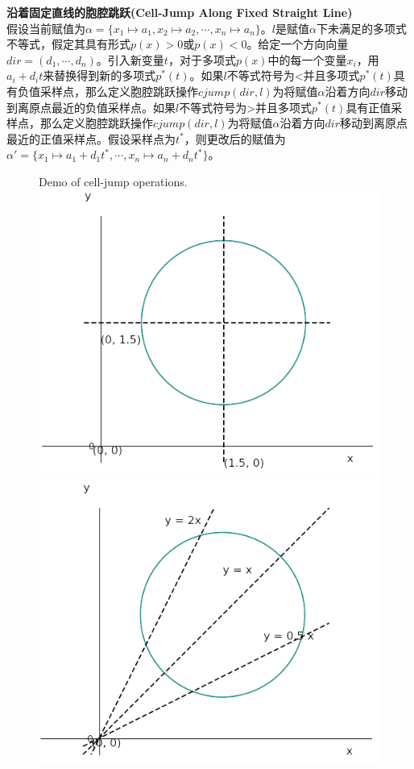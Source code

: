 \begin{definition}{\textbf{沿着固定直线的胞腔跳跃(Cell-Jump Along Fixed Straight Line)}}\\
    假设当前赋值为$\alpha = \{x_1 \mapsto a_1, x_2 \mapsto a_2, \cdots, x_n \mapsto a_n\}$。$l$是赋值$\alpha$下未满足的多项式不等式，假定其具有形式$p(x) > 0$或$p(x) < 0$。给定一个方向向量$dir = (d_1, \cdots, d_n)$。引入新变量$t$，对于多项式$p(x)$中的每一个变量$x_i$，用$a_i + d_i t$来替换得到新的多项式$p^{*}(t)$。如果$l$不等式符号为<并且多项式$p^{*}(t)$具有负值采样点，那么定义胞腔跳跃操作$cjump(dir, l)$为将赋值$\alpha$沿着方向$dir$移动到离原点最近的负值采样点。如果$l$不等式符号为>并且多项式$p^{*}(t)$具有正值采样点，那么定义胞腔跳跃操作$cjump(dir, l)$为将赋值$\alpha$沿着方向$dir$移动到离原点最近的正值采样点。假设采样点为$t^*$，则更改后的赋值为$\alpha' = \{x_1 \mapsto a_1 + d_1 t^*, \cdots, x_n \mapsto a_n + d_n t^*\}$。
\end{definition}

\begin{figure}[t]
    \centering
     {Demo of cell-jump operations.}
    \includegraphics[width=0.45\columnwidth]{Img/jump1.png}\qquad
    \includegraphics[width=0.45\columnwidth]{Img/jump2.png}
\label{fig:cell-jump}
\end{figure}

